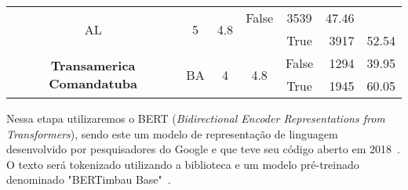 \begin{table}[]
{\begin{tabular}{|c|c|c|c|c|r|r|}
			\multirow{2}{*}{AL}                                             &
			\multirow{2}{*}{5}                                              &
			\multirow{2}{*}{4.8}                                            &
			False                                                           &
			3539                                                            &
			47.46                                                             \\ \cline{5-7}
			                                                                &
			                                                                &
			                                                                &
			                                                                &
			True                                                            &
			3917                                                            &
			52.54                                                             \\ \hline
			\multirow{2}{*}{\textbf{Transamerica Comandatuba}}              &
			\multirow{2}{*}{BA}                                             &
			\multirow{2}{*}{4}                                              &
			\multirow{2}{*}{4.8}                                            &
			False                                                           &
			1294                                                            &
			39.95                                                             \\ \cline{5-7}
			                                                                &
			                                                                &
			                                                                &
			                                                                &
			True                                                            &
			1945                                                            &
			60.05                                                             \\ \hline
		\end{tabular}%
	}
\end{table}%
%



Nessa etapa utilizaremos o BERT (\emph{Bidirectional Encoder Representations from Transformers}), sendo este um modelo de representação de linguagem desenvolvido por pesquisadores do Google e que teve seu código aberto em 2018~\cite{hugoZanini2021mediu}. O texto será tokenizado utilizando a biblioteca e um modelo pré-treinado denominado "BERTimbau Base"~\cite{souza2020bertimbau}.

